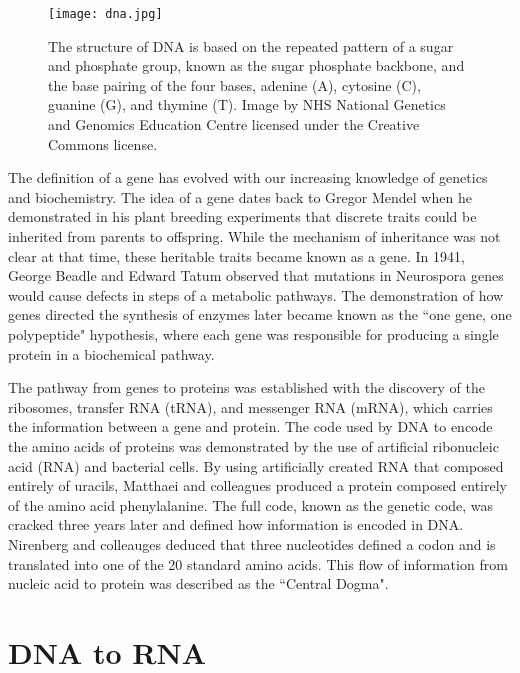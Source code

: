 \begin{figure}[!ht]
   \centering
   \texttt{[image: dna.jpg]}
   \caption[The structure of DNA]{The structure of DNA is based on the repeated pattern of a sugar and phosphate group, known as the sugar phosphate backbone, and the base pairing of the four bases, adenine (A), cytosine (C), guanine (G), and thymine (T). Image by NHS National Genetics and Genomics Education Centre licensed under the Creative Commons license.}
   \label{fig:dna}
\end{figure}

The definition of a gene has evolved with our increasing knowledge of genetics and biochemistry\cite{pmid17567988}. The idea of a gene dates back to Gregor Mendel when he demonstrated in his plant breeding experiments that discrete traits could be inherited from parents to offspring. While the mechanism of inheritance was not clear at that time, these heritable traits became known as a gene. In 1941, George Beadle and Edward Tatum observed that mutations in Neurospora genes would cause defects in steps of a metabolic pathways\cite{Beadle15111941}. The demonstration of how genes directed the synthesis of enzymes later became known as the ``one gene, one polypeptide" hypothesis, where each gene was responsible for producing a single protein in a biochemical pathway.

The pathway from genes to proteins was established with the discovery of the ribosomes\cite{pmid14381428}, transfer RNA (tRNA)\cite{pmid13538965}, and messenger RNA (mRNA), which carries the information between a gene and protein\cite{BRENNER1961}. The code used by DNA to encode the amino acids of proteins was demonstrated by the use of artificial ribonucleic acid (RNA) and bacterial cells\cite{pmid14471390}. By using artificially created RNA that composed entirely of uracils, Matthaei and colleagues produced a protein composed entirely of the amino acid phenylalanine. The full code, known as the genetic code, was cracked three years later\cite{pmid5330357} and defined how information is encoded in DNA. Nirenberg and colleauges deduced that three nucleotides defined a codon and is translated into one of the 20 standard amino acids. This flow of information from nucleic acid to protein was described as the ``Central Dogma"\cite{crick1958protein}.

\section{DNA to RNA}

